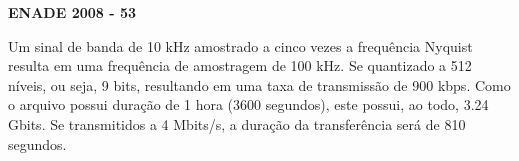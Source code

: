 \textbf{ENADE 2008 - 53}

Um sinal de banda de 10 kHz amostrado a cinco vezes a frequência Nyquist resulta em uma frequência de amostragem de 100 kHz. Se quantizado a 512 níveis, ou seja, 9 bits, resultando em uma taxa de transmissão de 900 kbps. Como o arquivo possui duração de 1 hora (3600 segundos), este possui, ao todo, 3.24 Gbits. Se transmitidos a 4 Mbits/s, a duração da transferência será de 810 segundos.